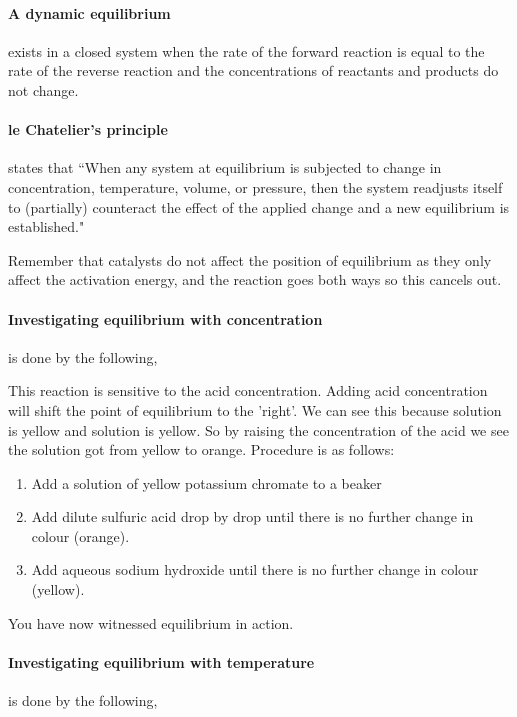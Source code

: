 	\paragraph{A dynamic equilibrium} exists in a closed system when the rate of the forward reaction is equal to the rate of the reverse reaction and the concentrations of reactants and products do not change.
	
	\paragraph{le Chatelier’s principle} states that ``When any system at equilibrium is subjected to change in concentration, temperature, volume, or pressure, then the system readjusts itself to (partially) counteract the effect of the applied change and a new equilibrium is established."
	
	Remember that catalysts do not affect the position of equilibrium as they only affect the activation energy, and the reaction goes both ways so this cancels out.
	
	\paragraph{Investigating equilibrium with concentration} is done by the following,
	
	\begin{center}
	\end{center}
	This reaction is sensitive to the acid concentration. Adding acid concentration will shift the point of equilibrium to the 'right'.
	We can see this because  solution is yellow and  solution is yellow.
	So by raising the concentration of the acid we see the solution got from yellow to orange.
	Procedure is as follows:
	\begin{enumerate}
		\item Add a solution of yellow potassium chromate to a beaker
		\item Add dilute sulfuric acid drop by drop until there is no further change in colour (orange).
		\item Add aqueous sodium hydroxide until there is no further change in colour (yellow).
	\end{enumerate}
	You have now witnessed equilibrium in action.
	\paragraph{Investigating equilibrium with temperature} is done by the following,
	
